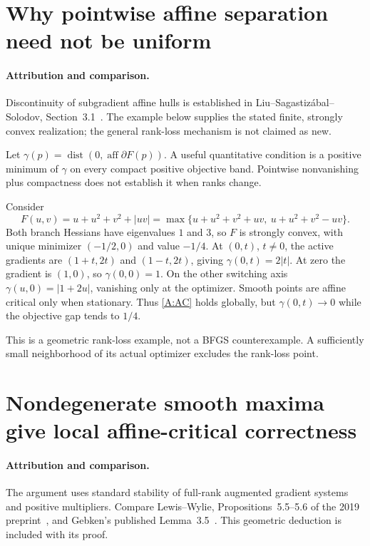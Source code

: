 \section{Why pointwise affine separation need not be uniform}
\paragraph{Attribution and comparison.}
Discontinuity of subgradient affine hulls is established in Liu--Sagastiz\'abal--Solodov, Section~3.1~\cite{geom_LSS2019}. The example below supplies the stated finite, strongly convex realization; the general rank-loss mechanism is not claimed as new.

Let $\gamma(p)=\operatorname{dist}(0,\operatorname{aff}\partial F(p))$. A useful quantitative condition is a positive minimum of $\gamma$ on every compact positive objective band. Pointwise nonvanishing plus compactness does not establish it when ranks change.

Consider
\[
 F(u,v)=u+u^2+v^2+|uv|
 =\max\{u+u^2+v^2+uv,\ u+u^2+v^2-uv\}.
\]
Both branch Hessians have eigenvalues $1$ and $3$, so $F$ is strongly convex, with unique minimizer $(-1/2,0)$ and value $-1/4$. At $(0,t)$, $t\ne0$, the active gradients are $(1+t,2t)$ and $(1-t,2t)$, giving $\gamma(0,t)=2|t|$. At zero the gradient is $(1,0)$, so $\gamma(0,0)=1$. On the other switching axis $\gamma(u,0)=|1+2u|$, vanishing only at the optimizer. Smooth points are affine critical only when stationary. Thus \eqref{A:AC} holds globally, but $\gamma(0,t)\to0$ while the objective gap tends to $1/4$.

This is a geometric rank-loss example, not a BFGS counterexample. A sufficiently small neighborhood of its actual optimizer excludes the rank-loss point.

\section{Nondegenerate smooth maxima give local affine-critical correctness}
\paragraph{Attribution and comparison.}
The argument uses standard stability of full-rank augmented gradient systems and positive multipliers. Compare Lewis--Wylie, Propositions~5.5--5.6 of the 2019 preprint~\cite{LW}, and Gebken's published Lemma~3.5~\cite{BG}. This geometric deduction is included with its proof.

